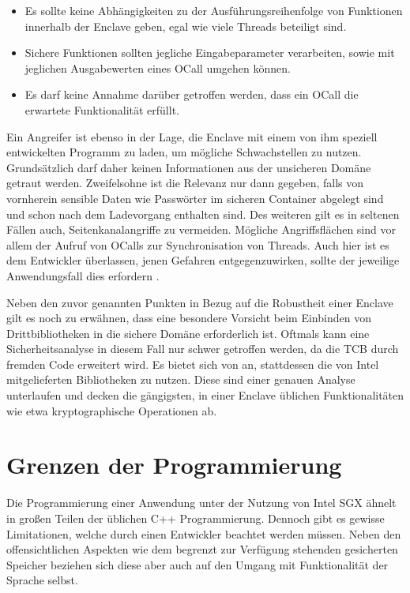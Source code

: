 \begin{itemize}
	\item Es sollte keine Abhängigkeiten zu der Ausführungsreihenfolge von Funktionen innerhalb der Enclave geben, egal wie viele Threads beteiligt sind.
	\item Sichere Funktionen sollten jegliche Eingabeparameter verarbeiten, sowie mit jeglichen Ausgabewerten eines \ac{OCall} umgehen können.
	\item Es darf keine Annahme darüber getroffen werden, dass ein \ac{OCall} die erwartete Funktionalität erfüllt.
\end{itemize}

Ein Angreifer ist ebenso in der Lage, die Enclave mit einem von ihm speziell entwickelten Programm zu laden, um mögliche Schwachstellen zu nutzen. Grundsätzlich darf daher keinen Informationen aus der unsicheren Domäne getraut werden. Zweifelsohne ist die Relevanz nur dann gegeben, falls von vornherein sensible Daten wie Passwörter im sicheren Container abgelegt sind und schon nach dem Ladevorgang enthalten sind. Des weiteren gilt es in seltenen Fällen auch, Seitenkanalangriffe zu vermeiden. Mögliche Angriffsflächen sind vor allem der Aufruf von \acp{OCall} zur Synchronisation von Threads. Auch hier ist es dem Entwickler überlassen, jenen Gefahren entgegenzuwirken, sollte der jeweilige Anwendungsfall dies erfordern \cite{M.2016}.

Neben den zuvor genannten Punkten in Bezug auf die Robustheit einer Enclave gilt es noch zu erwähnen, dass eine besondere Vorsicht beim Einbinden von Drittbibliotheken in die sichere Domäne erforderlich ist. Oftmals kann eine Sicherheitsanalyse in diesem Fall nur schwer getroffen werden, da die \ac{TCB} durch fremden Code erweitert wird. Es bietet sich von an, stattdessen die von Intel mitgelieferten Bibliotheken zu nutzen. Diese sind einer genauen Analyse unterlaufen und decken die gängigsten, in einer Enclave üblichen Funktionalitäten wie etwa kryptographische Operationen ab. 
\section{Grenzen der Programmierung}

Die Programmierung einer Anwendung unter der Nutzung von Intel \ac{SGX} ähnelt in großen Teilen der üblichen C++ Programmierung. Dennoch gibt es gewisse Limitationen, welche durch einen Entwickler beachtet werden müssen. Neben den offensichtlichen Aspekten wie dem begrenzt zur Verfügung stehenden gesicherten Speicher beziehen sich diese aber auch auf den Umgang mit Funktionalität der Sprache selbst. 

